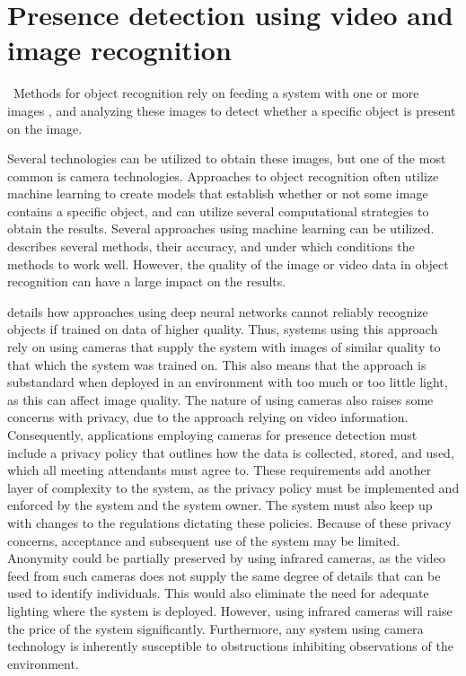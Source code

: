 \section{Presence detection using video and image recognition} \label{sec:video-based-detection}\
Methods for object recognition rely on feeding a system with one or more images \cite{huttenlocher1987object, computational_strategies_for_object_recog}, and analyzing these images to detect whether a specific object is present on the image.

Several technologies can be utilized to obtain these images, but one of the most common is camera technologies\cite{FUERTES2022103473}. 
Approaches to object recognition often utilize machine learning to create models that establish whether or not some image contains a specific object\cite{huttenlocher1987object}, and can utilize several computational strategies to obtain the results\cite{computational_strategies_for_object_recog}. 
Several approaches using machine learning can be utilized. 
\citeauthor{object_recognision_survey} \cite{object_recognision_survey} describes several methods, their accuracy, and under which conditions the methods to work well. 
However, the quality of the image or video data in object recognition can have a large impact on the results.

\citeauthor{vid_qual_affects} \cite{vid_qual_affects} details how approaches using deep neural networks cannot reliably recognize objects if trained on data of higher quality. 
Thus, systems using this approach rely on using cameras that supply the system with images of similar quality to that which the system was trained on.
This also means that the approach is substandard when deployed in an environment with too much or too little light, as this can affect image quality.  
The nature of using cameras also raises some concerns with privacy, due to the approach relying on video information. 
Consequently, applications employing cameras for presence detection must include a privacy policy that outlines how the data is collected, stored, and used, which all meeting attendants must agree to.
These requirements add another layer of complexity to the system, as the privacy policy must be implemented and enforced by the system and the system owner.
The system must also keep up with changes to the regulations dictating these policies.
Because of these privacy concerns, acceptance and subsequent use of the system may be limited\cite{granath_detecting_nodate, tang_occupancy_2020, privacyPreservingSensor}.
Anonymity could be partially preserved by using infrared cameras, as the video feed from such cameras does not supply the same degree of details that can be used to identify individuals. 
This would also eliminate the need for adequate lighting where the system is deployed.  
However, using infrared cameras will raise the price of the system significantly. 
Furthermore, any system using camera technology is inherently susceptible to obstructions inhibiting observations of the environment.

